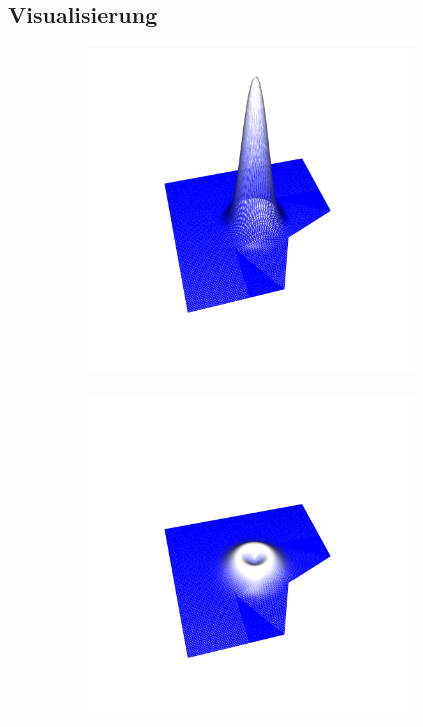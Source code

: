 \documentclass[crop=false,10pt,ngerman]{standalone}
\begin{document}
    \subsection{Visualisierung} %
    \label{sub:visualisierung}

      \begin{figure}[h]
        \center
        \begin{subfigure}[b]{0.24\textwidth}
          \center
          \includegraphics[trim={4cm 1.2cm 4.5cm 1.5cm},clip,width=0.95\textwidth]{images/test_wave_0.png}
          \caption{}
        \end{subfigure}
        \begin{subfigure}[b]{0.24\textwidth}
          \center
          \includegraphics[trim={4cm 1.2cm 4.5cm 1.5cm},clip,width=0.95\textwidth]{images/test_wave_1.png}

\end{subfigure}
\end{figure}
\end{document}
